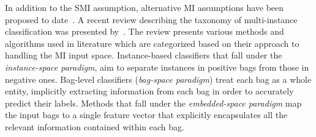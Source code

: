 \documentclass[preprint,12pt]{elsarticle}
\begin{document}
In addition to the SMI assumption, alternative MI assumptions have been proposed to date~\citep{Foulds2010}. A recent review describing the taxonomy of multi-instance classification was presented by~\citet{Amores2013}. The review presents various methods and algorithms used in literature which are categorized based on their approach to handling the MI input space. Instance-based classifiers that fall under the \textit{instance-space paradigm}, aim to separate instances in positive bags from those in negative ones. Bag-level classifiers (\textit{bag-space paradigm}) treat each bag as a whole entity, implicitly extracting information from each bag in order to accurately predict their labels. Methods that fall under the \textit{embedded-space paradigm} map the input bags to a single feature vector that explicitly encapsulates all the relevant information contained within each bag.
\end{document}
